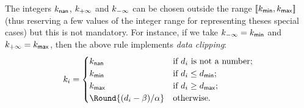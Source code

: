 \documentclass[]{article}
\newcommand*{\IntRange}[1]{[\![#1]\!]}
\begin{document}
The integers $k_{\mathsf{nan}}$, $k_{\mathsf{+\infty}}$ and $k_{\mathsf{-\infty}}$ can be
chosen outside the range $\IntRange{k_\Tag{min},k_\Tag{max}}$ (thus reserving a
few values of the integer range for representing theses special cases) but this
is not mandatory.  For instance, if we take $k_{\mathsf{-\infty}} = k_{\mathsf{min}}$ and
$k_{\mathsf{+\infty}} = k_{\mathsf{max}}$, then the above rule implements \emph{data
clipping}:
\begin{equation}
  \label{eq:digitization-with-clipping}
  k_i = \begin{cases}
     k_\Tag{nan} & \text{if $d_i$ is not a number;}\\
     k_\Tag{min} & \text{if $d_i \le d_\Tag{min}$;}\\
     k_\Tag{max} & \text{if $d_i \ge d_\Tag{max}$;}\\
     \Round{(d_i - \beta)/\alpha} & \text{otherwise.}
  \end{cases}
\end{equation}



\end{document}
